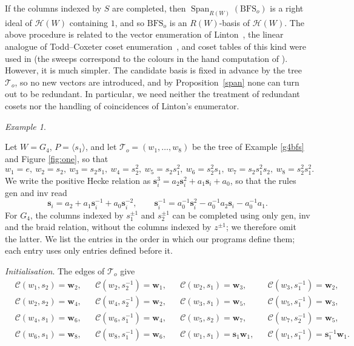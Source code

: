 \documentclass[11pt, reqno]{amsart}
\newcommand{\cC}{\mathcal{C}}
\newcommand{\cH}{\mathcal{H}}
\newcommand{\cT}{\mathcal{T}}
\newcommand{\BFS}{\mathrm{BFS}}
\numberwithin{equation}{section}
\theoremstyle{remark}
\newtheorem{example}[theorem]{Example}
\begin{document}
		If the columns indexed by $S$ are completed, then $\operatorname{Span}_{R(W)}(\BFS_o)
		$
		is a right ideal of $\cH(W)$ containing $1$, and so $\BFS_o$ is an $R(W)$-basis of $\cH(W)$. The above procedure is related to the vector enumeration of Linton~\cite{Lin}, the linear analogue of Todd--Coxeter coset enumeration~\cite{toco, HEO}, and coset tables of this kind were used in \cite{ChPf1, ChPf} (the sweeps correspond to the colours in the hand computation of \cite[Example~3.1]{ChPf}). However, it is much simpler. The candidate basis is fixed in advance by the tree $\cT_o$, so no new vectors are introduced, and by Proposition~\ref{span} none can turn out to be redundant. In particular, we need neither the treatment of redundant cosets nor the handling of coincidences of Linton's enumerator.
		
		
		\begin{example}\label{ex:G4table}{\rm
				Let $W=G_4$, $P=\langle s_1\rangle$, and let $\cT_o=(w_1,\dots,w_8)$ be
				the tree of Example \ref{g4bfs} and Figure \ref{fig:one}, so that
				\[
				w_1=e,\ w_2=s_2,\ w_3=s_2s_1,\ w_4=s_2^2,\ w_5=s_2s_1^2,\
				w_6=s_2^2s_1,\ w_7=s_2s_1^2s_2,\ w_8=s_2^2s_1^2.
				\]
				We write the positive Hecke relation as
				$\mathbf s_i^3=a_2\mathbf s_i^2+a_1\mathbf s_i+a_0$, so that the rules
				\textsf{gen} and \textsf{inv} read
				\[
				\mathbf s_i=a_2+a_1\mathbf s_i^{-1}+a_0\mathbf s_i^{-2},\qquad
				\mathbf s_i^{-1}=a_0^{-1}\mathbf s_i^2-a_0^{-1}a_2\mathbf s_i-a_0^{-1}a_1.
				\]
				For $G_4$, the columns indexed by
				$s_1^{\pm1}$ and $s_2^{\pm1}$ can be completed using only \textsf{gen},
				\textsf{inv} and the braid relation, without the columns indexed by
				$z^{\pm1}$; we therefore omit the latter. We list the entries in the
				order in which our programs define them; each entry uses only entries
				defined before it.
				
				\smallskip
				\noindent\emph{Initialisation}. The edges of $\cT_o$ give
				\begin{align*}
					&\cC(w_1,s_2)=\mathbf w_2, && \cC(w_2,s_2^{-1})=\mathbf w_1, &
					&\cC(w_2,s_1)=\mathbf w_3, && \cC(w_3,s_1^{-1})=\mathbf w_2,\\
					&\cC(w_2,s_2)=\mathbf w_4, && \cC(w_4,s_2^{-1})=\mathbf w_2, &
					&\cC(w_3,s_1)=\mathbf w_5, && \cC(w_5,s_1^{-1})=\mathbf w_3,\\
					&\cC(w_4,s_1)=\mathbf w_6, && \cC(w_6,s_1^{-1})=\mathbf w_4, &
					&\cC(w_5,s_2)=\mathbf w_7, && \cC(w_7,s_2^{-1})=\mathbf w_5,\\
					&\cC(w_6,s_1)=\mathbf w_8, && \cC(w_8,s_1^{-1})=\mathbf w_6, &
					&\cC(w_1,s_1)=\mathbf s_1\mathbf w_1, && \cC(w_1,s_1^{-1})=\mathbf s_1^{-1}\mathbf w_1.
				\end{align*}
			
}
\end{example}
\end{document}
